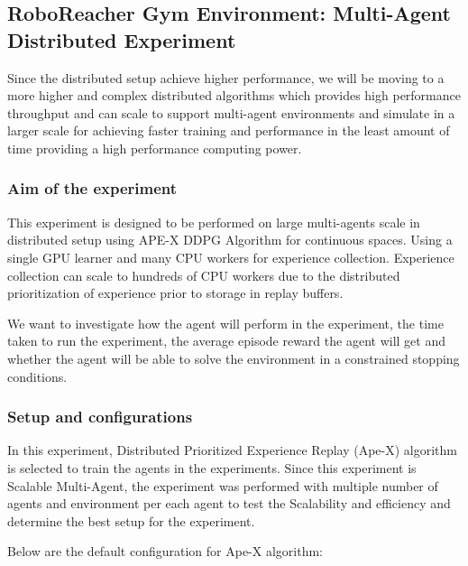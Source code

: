 
\subsection{RoboReacher Gym Environment: Multi-Agent Distributed Experiment}

Since the distributed setup achieve higher performance, we will be moving to a more higher and complex distributed algorithms which provides high performance throughput and can scale to support multi-agent environments and simulate in a larger scale for achieving faster training and performance in the least amount of time providing a high performance computing power.

\subsubsection{Aim of the experiment}

This experiment is designed to be performed on large multi-agents scale in distributed setup using APE-X DDPG Algorithm for continuous spaces. Using a single GPU learner and many CPU workers for experience collection. Experience collection can scale to hundreds of CPU workers due to the distributed prioritization of experience prior to storage in replay buffers.

We want to investigate how the agent will perform in the experiment, the time taken to run the experiment, the average episode reward the agent will get and whether the agent will be able to solve the environment in a constrained stopping conditions.

\subsubsection{Setup and configurations}

In this experiment, Distributed Prioritized Experience Replay (Ape-X) algorithm is selected to train the agents in the experiments. Since this experiment is Scalable Multi-Agent, the experiment was performed with multiple number of agents and environment per each agent to test the Scalability and efficiency and determine the best setup for the experiment.

Below are the default configuration for Ape-X algorithm:


